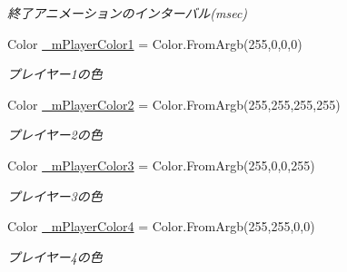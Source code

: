 \begin{DoxyCompactItemize}
\begin{DoxyCompactList}\small\item\em 終了アニメーションのインターバル(msec) \end{DoxyCompactList}\item 
\mbox{\label{class_reversi4color_form_1_1_reversi_setting_a96a4e36ff775829162ce510db59f69a7}} 
Color \hyperlink{class_reversi4color_form_1_1_reversi_setting_a96a4e36ff775829162ce510db59f69a7}{\+\_\+m\+Player\+Color1} = Color.\+From\+Argb(255,0,0,0)
\begin{DoxyCompactList}\small\item\em プレイヤー1の色 \end{DoxyCompactList}\item 
\mbox{\label{class_reversi4color_form_1_1_reversi_setting_a5d7c4582ef4427a13d72ffc492af2c9a}} 
Color \hyperlink{class_reversi4color_form_1_1_reversi_setting_a5d7c4582ef4427a13d72ffc492af2c9a}{\+\_\+m\+Player\+Color2} = Color.\+From\+Argb(255,255,255,255)
\begin{DoxyCompactList}\small\item\em プレイヤー2の色 \end{DoxyCompactList}\item 
\mbox{\label{class_reversi4color_form_1_1_reversi_setting_a4679da9b768f3ed9989278a0a5c524b5}} 
Color \hyperlink{class_reversi4color_form_1_1_reversi_setting_a4679da9b768f3ed9989278a0a5c524b5}{\+\_\+m\+Player\+Color3} = Color.\+From\+Argb(255,0,0,255)
\begin{DoxyCompactList}\small\item\em プレイヤー3の色 \end{DoxyCompactList}\item 
\mbox{\label{class_reversi4color_form_1_1_reversi_setting_a98467c2e80133c9a0978b0937fa7de99}} 
Color \hyperlink{class_reversi4color_form_1_1_reversi_setting_a98467c2e80133c9a0978b0937fa7de99}{\+\_\+m\+Player\+Color4} = Color.\+From\+Argb(255,255,0,0)
\begin{DoxyCompactList}\small\item\em プレイヤー4の色 \end{DoxyCompactList}\item 

\end{DoxyCompactItemize}

